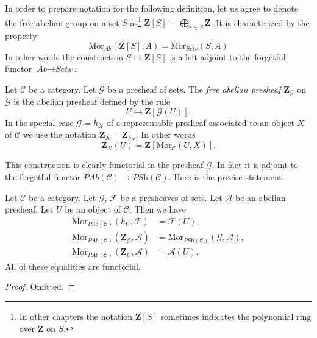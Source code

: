 \noindent
In order to prepare notation for the following definition, let us agree
to denote the free abelian group on a set $S$ as\footnote{In other chapters
the notation $\mathbf{Z}[S]$ sometimes indicates the polynomial ring over
$\mathbf{Z}$ on $S$.}
$\mathbf{Z}[S] = \bigoplus_{s \in S} \mathbf{Z}$. It is characterized
by the property
$$
\text{Mor}_{\textit{Ab}}(\mathbf{Z}[S], A)
=
\text{Mor}_{\textit{Sets}}(S, A)
$$
In other words the construction $S \mapsto \mathbf{Z}[S]$ is a left adjoint
to the forgetful functor $\textit{Ab} \to \textit{Sets}$.

\begin{definition}
\label{definition-free-abelian-presheaf-on}
Let $\mathcal{C}$ be a category. Let $\mathcal{G}$ be a presheaf of sets.
The {\it free abelian presheaf} $\mathbf{Z}_{\mathcal{G}}$ on $\mathcal{G}$
is the abelian presheaf defined by the rule
$$
U \longmapsto \mathbf{Z}[\mathcal{G}(U)].
$$
In the special case $\mathcal{G} = h_X$ of a representable presheaf
associated to an object $X$ of $\mathcal{C}$
we use the notation $\mathbf{Z}_X = \mathbf{Z}_{h_X}$. In other words
$$
\mathbf{Z}_X(U) = \mathbf{Z}[\text{Mor}_{\mathcal{C}}(U, X)].
$$
\end{definition}

\noindent
This construction is clearly functorial in the presheaf $\mathcal{G}$.
In fact it is adjoint to the forgetful functor
$\textit{PAb}(\mathcal{C}) \to \textit{PSh}(\mathcal{C})$.
Here is the precise statement.

\begin{lemma}
\label{lemma-obvious-adjointness}
Let $\mathcal{C}$ be a category.
Let $\mathcal{G}$, $\mathcal{F}$ be a presheaves of sets.
Let $\mathcal{A}$ be an abelian presheaf.
Let $U$ be an object of $\mathcal{C}$. Then
we have
\begin{align*}
\text{Mor}_{\textit{PSh}(\mathcal{C})}(h_U, \mathcal{F})
& =
\mathcal{F}(U), \\
\text{Mor}_{\textit{PAb}(\mathcal{C})}(\mathbf{Z}_{\mathcal{G}}, \mathcal{A})
& =
\text{Mor}_{\textit{PSh}(\mathcal{C})}(\mathcal{G}, \mathcal{A}), \\
\text{Mor}_{\textit{PAb}(\mathcal{C})}(\mathbf{Z}_U, \mathcal{A})
& =
\mathcal{A}(U).
\end{align*}
All of these equalities are functorial.
\end{lemma}

\begin{proof}
Omitted.
\end{proof}

